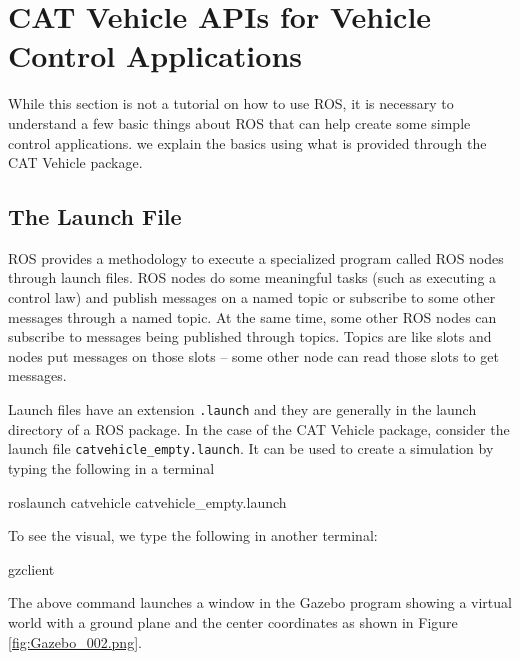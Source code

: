 \documentclass[
]{article}
\newenvironment{Shaded}{\begin{snugshade}}{\end{snugshade}}
\newcommand{\ExtensionTok}[1]{#1}
\newcommand{\NormalTok}[1]{#1}
\begin{document}
\hypertarget{cat-vehicle-apis-for-vehicle-control-applications}{%
\section{CAT Vehicle APIs for Vehicle Control
Applications}\label{cat-vehicle-apis-for-vehicle-control-applications}}

\label{sec:API} While this section is not a tutorial on how to use ROS,
it is necessary to understand a few basic things about ROS that can help
create some simple control applications. we explain the basics using
what is provided through the CAT Vehicle package.

\hypertarget{the-launch-file}{%
\subsection{The Launch File}\label{the-launch-file}}

ROS provides a methodology to execute a specialized program called ROS
nodes through launch files. ROS nodes do some meaningful tasks (such as
executing a control law) and publish messages on a named topic or
subscribe to some other messages through a named topic. At the same
time, some other ROS nodes can subscribe to messages being published
through topics. Topics are like slots and nodes put messages on those
slots -- some other node can read those slots to get messages.

Launch files have an extension \texttt{.launch} and they are generally
in the launch directory of a ROS package. In the case of the CAT Vehicle
package, consider the launch file \texttt{catvehicle\_empty.launch}. It
can be used to create a simulation by typing the following in a terminal

\begin{Shaded}
\begin{Highlighting}[]
\ExtensionTok{roslaunch}\NormalTok{ catvehicle catvehicle\_empty.launch}
\end{Highlighting}
\end{Shaded}

To see the visual, we type the following in another terminal:

\begin{Shaded}
\begin{Highlighting}[]
\ExtensionTok{gzclient}
\end{Highlighting}
\end{Shaded}

The above command launches a window in the Gazebo program showing a
virtual world with a ground plane and the center coordinates as shown in
Figure \ref{fig:Gazebo_002.png}.
\end{document}
